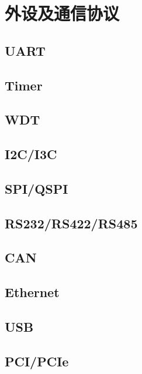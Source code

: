 \chapter{外设及通信协议}

\section{UART}

\section{Timer}

\section{WDT}

\section{I2C/I3C}

\section{SPI/QSPI}

\section{RS232/RS422/RS485}

\section{CAN}

\section{Ethernet}

\section{USB}

\section{PCI/PCIe}

